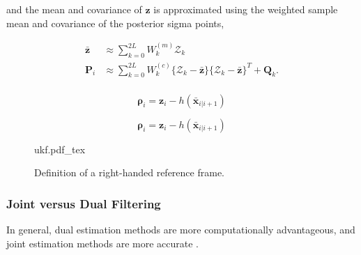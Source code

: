 and the mean and covariance of $\bm{z}$ is approximated using the weighted
sample mean and covariance of the posterior sigma points,

\begin{equation}
    \begin{aligned}
        \bar{\bm{z}} & \approx \sum_{k=0}^{2L} W_k^{(m)}\mathcal{Z}_k                                                   \\
        \bm{P}_i     & \approx \sum_{k=0}^{2L} W_k^{(c)}\{\mathcal{Z}_k-\bar{\bm{z}}\}\{\mathcal{Z}_k-\bar{\bm{z}}\}^T +\bm{Q}_k. \\
    \end{aligned}
\end{equation}



\begin{equation}
   \bm{\rho}_i = \bm{z}_i - h(\bar{\bm{x}}_{i|i+1})
\end{equation}



\begin{equation}
   \bm{\rho}_i = \bm{z}_i - h(\bar{\bm{x}}_{i|i+1})
\end{equation}

\begin{figure}[h]
    \centering
    \def\svgwidth{0.75\linewidth}
    {ukf.pdf_tex}
    \caption{Definition of a right-handed reference frame.}
    \label{fig:frames_rh}
\end{figure}

\subsubsection{Joint versus Dual Filtering}

In general, dual estimation methods are more computationally advantageous, and
joint estimation methods are more accurate \cite{Plett2005}.



